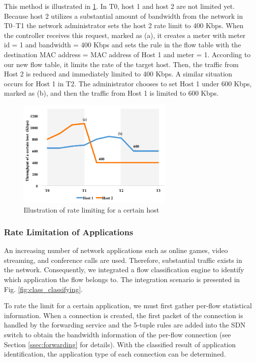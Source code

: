 \documentclass[journal]{IEEEtran}
\begin{document}
This method is illustrated in \ref{fig:mft_qos_rate_host}. In T0, host 1 and host 2 are not limited yet. Because host 2 utilizes a substantial amount of bandwidth from the network in T0–T1  the network administrator sets the host 2 rate limit to 400 Kbps. When the controller receives this request, marked as (a), it creates a meter with meter id = 1 and bandwidth = 400 Kbps and sets the rule in the flow table with the destination MAC address = MAC address of Host 1 and meter = 1. According to our new flow table, it limits the rate of the target host. Then, the traffic from Host 2 is reduced and immediately limited to 400 Kbps. A similar situation occurs for Host 1 in T2. The administrator chooses to set Host 1 under 600 Kbps, marked as (b), and then the traffic from Host 1 is limited to 600 Kbps.

\begin{figure}[!t]
\centering
\includegraphics[width=3in]{./figures/mft_qos_rate_host}
\caption{Illustration of rate limiting for a certain host}
\label{fig:mft_qos_rate_host}
\end{figure}

\subsubsection{Rate Limitation of Applications}

An increasing number of network applications such as online games, video streaming, and conference calls are used. Therefore, substantial traffic exists in the network. Consequently, we integrated a flow classification engine to identify which application the flow belongs to. The integration scenario is presented in Fig. \ref{fig:class_classifying}.

To rate the limit for a certain application, we must first gather per-flow statistical information. When a connection is created, the first packet of the connection is handled by the forwarding service and the 5-tuple rules are added into the SDN switch to obtain the bandwidth information of the per-flow connection (see Section \ref{ssec:forwarding} for details). With the classified result of application identification, the application type of each connection can be determined.
\end{document}

